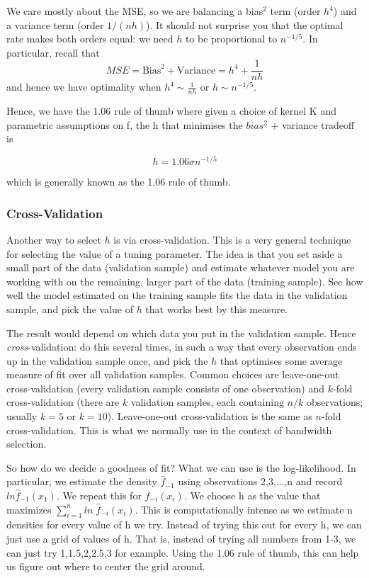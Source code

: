 \documentclass[twoside]{article}
\begin{document}
We care mostly about the MSE, so we are balancing a bias$^2$ term (order $h^4$) and a variance term (order $1/\left(nh\right)$). It should not surprise you that the optimal rate makes both orders equal: we need $h$ to be proportional to $n^{-1/5}$. In particular, recall that
$$
MSE = \text{Bias}^2 + \text{Variance} = h^4 + \frac{1}{nh}
$$
and hence we have optimality when $h^4 \sim \frac{1}{nh}$ or $h \sim n^{-1/5}$. 

Hence, we have the 1.06 rule of thumb where given a choice of kernel K and parametric assumptions on f, the h that minimises the $bias^2$ + variance tradeoff is

$$
h = 1.06 \sigma n^{-1/5}
$$

which is generally known as the 1.06 rule of thumb.

\subsubsection{Cross-Validation}
Another way to select $h$ is via cross-validation. This is a very general technique for selecting the value of a tuning parameter. The idea is that you set aside a small part of the data (validation sample) and estimate whatever model you are working with on the remaining, larger part of the data (training sample). See how well the model estimated on the training sample fits the data in the validation sample, and pick the value of $h$ that works best by this measure.

The result would depend on which data you put in the validation sample. Hence \textit{cross}-validation: do this several times, in such a way that every observation ends up in the validation sample once, and pick the $h$ that optimises some average measure of fit over all validation samples. Common choices are leave-one-out cross-validation (every validation sample consists of one observation) and $k$-fold cross-validation (there are $k$ validation samples, each containing $n/k$ observations; usually $k=5$ or $k=10$). Leave-one-out cross-validation is the same as $n$-fold cross-validation. This is what we normally use in the context of bandwidth selection.

So how do we decide a goodness of fit? What we can use is the log-likelihood. In particular, we estimate the density $\hat{f}_{-1}$ using observations 2,3,...,n and record $ln\hat{f}_{-1}(x_1)$. We repeat this for $\hat{f}_{-i}(x_i)$. We choose h as the value that maximizes $\sum_{i=1}^nln\;\hat{f}_{-i}(x_i)$. This is computationally intense as we estimate n densities for every value of h we try. Instead of trying this out for every h, we can just use a grid of values of h. That is, instead of trying all numbers from 1-3, we can just try 1,1.5,2,2.5,3 for example. Using the 1.06 rule of thumb, this can help us figure out where to center the grid around.
\end{document}
